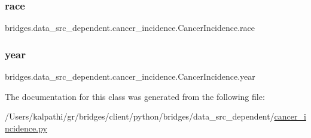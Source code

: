 \subsubsection{\texorpdfstring{race}{race}}
{\footnotesize\ttfamily bridges.\+data\+\_\+src\+\_\+dependent.\+cancer\+\_\+incidence.\+Cancer\+Incidence.\+race}

\mbox{\label{classbridges_1_1data__src__dependent_1_1cancer__incidence_1_1_cancer_incidence_a962b7cd1837e9d964bd01b9e285c7fa9}} 
\subsubsection{\texorpdfstring{year}{year}}
{\footnotesize\ttfamily bridges.\+data\+\_\+src\+\_\+dependent.\+cancer\+\_\+incidence.\+Cancer\+Incidence.\+year}



The documentation for this class was generated from the following file\+:\begin{DoxyCompactItemize}
\item 
/\+Users/kalpathi/gr/bridges/client/python/bridges/data\+\_\+src\+\_\+dependent/\mbox{\hyperlink{cancer__incidence_8py}{cancer\+\_\+incidence.\+py}}\end{DoxyCompactItemize}

